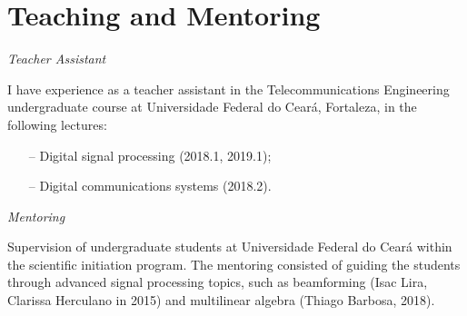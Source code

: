 \section{Teaching and Mentoring}

{\sl Teacher Assistant} 

I have experience as a teacher assistant in the Telecommunications Engineering undergraduate course at Universidade Federal do Cear\'a, Fortaleza, in the following lectures:
\begin{itemize}
	\item[--] Digital signal processing (2018.1, 2019.1);
	\item[--] Digital communications systems (2018.2).
\end{itemize}

{\sl Mentoring}

Supervision of undergraduate students at Universidade Federal do Cear\'a within the scientific initiation program. The mentoring consisted of guiding the students through advanced signal processing topics, such as beamforming (Isac Lira, Clarissa Herculano in 2015) and multilinear algebra (Thiago Barbosa, 2018).